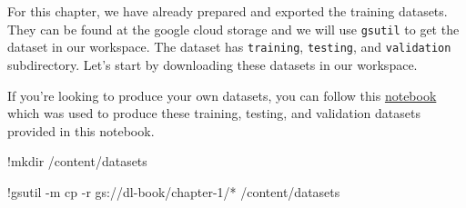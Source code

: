 \documentclass[
  letterpaper,
  DIV=11,
  numbers=noendperiod]{scrreprt}
\newenvironment{Shaded}{\begin{snugshade}}{\end{snugshade}}
\newcommand{\DecValTok}[1]{\textcolor[rgb]{0.68,0.00,0.00}{#1}}
\newcommand{\NormalTok}[1]{\textcolor[rgb]{0.00,0.23,0.31}{#1}}
\newcommand{\OperatorTok}[1]{\textcolor[rgb]{0.37,0.37,0.37}{#1}}
\begin{document}
For this chapter, we have already prepared and exported the training
datasets. They can be found at the google cloud storage and we will use
\texttt{gsutil} to get the dataset in our workspace. The dataset has
\texttt{training}, \texttt{testing}, and \texttt{validation}
subdirectory. Let's start by downloading these datasets in our
workspace.

If you're looking to produce your own datasets, you can follow this
\href{https://colab.research.google.com/drive/1LCFLeSCu969wIW8TD68-j4hfIu7WiRIK?usp=sharing}{notebook}
which was used to produce these training, testing, and validation
datasets provided in this notebook.

\begin{Shaded}
\begin{Highlighting}[]
\OperatorTok{!}\NormalTok{mkdir }\OperatorTok{/}\NormalTok{content}\OperatorTok{/}\NormalTok{datasets}
\end{Highlighting}
\end{Shaded}

\begin{Shaded}
\begin{Highlighting}[]
\OperatorTok{!}\NormalTok{gsutil }\OperatorTok{{-}}\NormalTok{m cp }\OperatorTok{{-}}\NormalTok{r gs:}\OperatorTok{//}\NormalTok{dl}\OperatorTok{{-}}\NormalTok{book}\OperatorTok{/}\NormalTok{chapter}\OperatorTok{{-}}\DecValTok{1}\OperatorTok{/*} \OperatorTok{/}\NormalTok{content}\OperatorTok{/}\NormalTok{datasets}
\end{Highlighting}
\end{Shaded}
\end{document}
